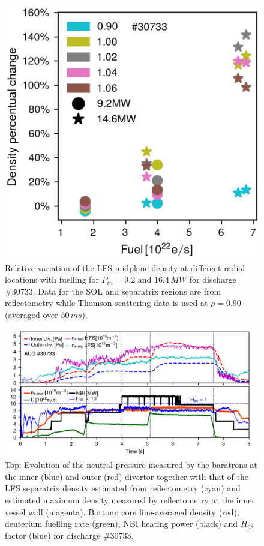 \documentclass[12pt]{iopart}
\begin{document}
\begin{figure}[!bt]
    \centering
    \includegraphics[]{Figure6.png}
    \caption[Relative variation of the LFS midplane density for \#30733.]{Relative variation of the LFS midplane density at different radial locations with fuelling for $P_{in}=9.2$ and $16.4\,MW$ for discharge \#30733. Data for the SOL and separatrix regions are from reflectometry while Thomson scattering data is used at $\rho=0.90$  (averaged over $50\,ms$).}
    \label{fig:pres_fuel_30733}
\end{figure}

\begin{figure}[!bt]
\centering
\includegraphics[]{Figure7.png}
\caption[Baratron neutral pressure evolution for \#30733.]{Top: Evolution of the neutral pressure measured by the baratrons at the inner (blue) and outer (red) divertor together with that of the LFS separatrix density estimated from reflectometry (cyan) and estimated maximum density measured by reflectometry at the inner vessel wall (magenta). Bottom: core line-averaged density (red), deuterium fuelling rate (green), NBI heating power (black) and $H_{98}$ factor (blue) for discharge \#30733.}
\label{fig:baratron_30733}
\end{figure}
\end{document}
